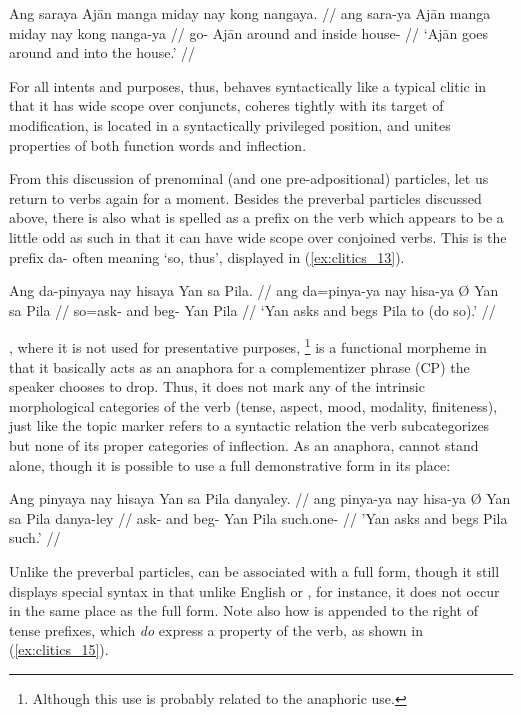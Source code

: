\a\label{ex:clitics_mangacoord2}\begingl
	\gla Ang saraya Ajān manga miday nay kong nangaya. //
	\glb ang sara-ya Ajān manga miday nay kong nanga-ya //
	\glc \AgtT{} go-\TsgM{} Ajān \Dyn{} around and inside house-\Loc{} //
	\glft `Ajān goes around and into the house.' //
\endgl
\xe

For all intents and purposes, thus,  behaves syntactically like
a typical clitic in that it has wide scope over conjuncts, coheres tightly with
its target of modification, is located in a syntactically privileged position,
and unites properties of both function words and inflection.

\label{clitics_preverb_da}
From this discussion of prenominal (and one pre-adpositional) particles, let us
return to verbs again for a moment. Besides the preverbal particles discussed
above, there is also what is spelled as a prefix on the verb which appears to
be a little odd as such in that it can have wide scope over conjoined verbs.
This is the prefix  {da-} often meaning `so, thus', displayed in
(\ref{ex:clitics_13}).

\ex\label{ex:clitics_13}\begingl
	\gla Ang da-pinyaya nay hisaya {} Yan sa Pila. //
	\glb ang da=pinya-ya nay hisa-ya Ø Yan sa Pila //
	\glc \AgtT{} so=ask-\TsgM{} and beg-\TsgM{} \Top{} Yan \Parg{} Pila //
	\glft `Yan asks and begs Pila to (do so).' //
\endgl\xe

, where it is not used for presentative purposes,
\footnote{Although this use is probably related to the anaphoric use.} is a
functional morpheme in that it basically acts as an anaphora for a
complementizer phrase (CP) the speaker chooses to drop. Thus, it does not mark
any of the intrinsic morphological categories of the verb (tense, aspect, mood,
modality, finiteness), just like the topic marker refers to a syntactic
relation the verb subcategorizes but none of its proper categories of 
inflection. As an anaphora,  cannot stand alone, though it is 
possible to use a full demonstrative form  in its 
place:

\ex\label{ex:clitics_14}\begingl
	\gla Ang pinyaya nay hisaya {} Yan sa Pila danyaley. //
	\glb ang pinya-ya nay hisa-ya Ø Yan sa Pila danya-ley //
	\glc \AgtT{} ask-\TsgM{} and beg-\TsgM{} \Top{} Yan \Parg{} Pila
		such.one-\PargI{} //
	\glft 'Yan asks and begs Pila such.' //
\endgl\xe

Unlike the preverbal particles,  can be associated with a full
form, though it still displays special syntax in that unlike English
 or , for instance, it does not occur in the same place as
the full form. Note also how  is appended to the right of tense
prefixes, which \emph{do} express a property of the verb, as shown in 
(\ref{ex:clitics_15}).

